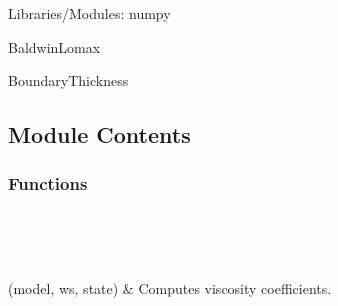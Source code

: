\documentclass[letterpaper,10pt,english]{sphinxmanual}
\begin{document}
\sphinxAtStartPar
Libraries/Modules:
numpy

\sphinxAtStartPar
BaldwinLomax

\sphinxAtStartPar
BoundaryThickness


\subsection{Module Contents}
\label{\detokenize{autoapi/Viscosity/index:module-contents}}

\subsubsection{Functions}
\label{\detokenize{autoapi/Viscosity/index:functions}}

\begin{savenotes}\sphinxatlongtablestart\begin{longtable}[c]{}
\hline

\endfirsthead

%
{}\\
\hline

\endhead

\hline
{}\\
\endfoot

\endlastfoot

\sphinxAtStartPar
{\hyperref[\detokenize{autoapi/Viscosity/index:Viscosity.compute_viscosity}]{}}(model, ws, state)
&
\sphinxAtStartPar
Computes viscosity coefficients.
\\
\hline
\end{longtable}\sphinxatlongtableend\end{savenotes}
\end{document}
